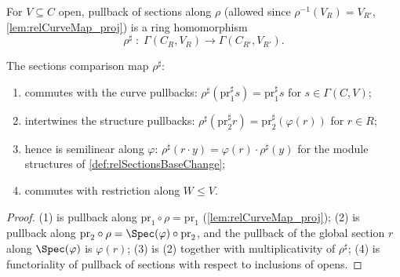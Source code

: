 \begin{definition}
  \label{def:relSectionsMap}
  \leanok
  For \(V \subseteq C\) open, pullback of sections along \(\rho\) (allowed since
  \(\rho^{-1}(V_R) = V_{R'}\), \ref{lem:relCurveMap_proj}) is a ring homomorphism
  \[
    \rho^{\sharp} \;:\; \Gamma(C_R, V_R) \longrightarrow \Gamma(C_{R'}, V_{R'}) .
  \]
\end{definition}

\begin{lemma}
  \label{lem:relSectionsMap_props}
  \leanok
  The sections comparison map \(\rho^{\sharp}\):
  \begin{enumerate}
    \item commutes with the curve pullbacks:
      \(\rho^{\sharp}(\mathrm{pr}_1^{\sharp} s) = \mathrm{pr}_1^{\sharp} s\) for
      \(s \in \Gamma(C, V)\);
    \item intertwines the structure pullbacks:
      \(\rho^{\sharp}(\mathrm{pr}_2^{\sharp} r) = \mathrm{pr}_2^{\sharp}(\varphi(r))\)
      for \(r \in R\);
    \item hence is semilinear along \(\varphi\):
      \(\rho^{\sharp}(r \cdot y) = \varphi(r) \cdot \rho^{\sharp}(y)\) for the module
      structures of \ref{def:relSectionsBaseChange};
    \item commutes with restriction along \(W \le V\).
  \end{enumerate}
\end{lemma}
\begin{proof}
  \leanok
  (1) is pullback along \(\mathrm{pr}_1 \circ \rho = \mathrm{pr}_1\)
  (\ref{lem:relCurveMap_proj}); (2) is pullback along
  \(\mathrm{pr}_2 \circ \rho = \Spec(\varphi) \circ \mathrm{pr}_2\), and the pullback of
  the global section \(r\) along \(\Spec(\varphi)\) is \(\varphi(r)\); (3) is (2)
  together with multiplicativity of \(\rho^{\sharp}\); (4) is functoriality of pullback
  of sections with respect to inclusions of opens.
\end{proof}

